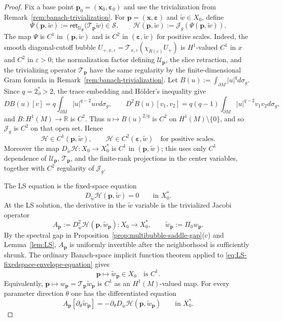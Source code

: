 \documentclass[11pt,reqno,a4paper]{amsart}
\numberwithin{equation}{section}
\theoremstyle{plain}
\theoremstyle{remark}
\theoremstyle{plain}
\begin{document}
\begin{proof}
Fix a base point $\mathbf p_0=(\mathbf x_0,\boldsymbol\varepsilon_0)$ and use the trivialization from
Remark~\ref{rem:banach-trivialization}.  For $\mathbf p=(\mathbf x,\boldsymbol\varepsilon)$ and
$\tilde w\in X_0$, define
\[
\Psi(\mathbf p,\tilde w)
:=
\mathsf{ret}_{\mathcal U_{\mathbf p}}
\bigl(\mathcal T_{\mathbf p}\tilde w\bigr)
\in\mathcal S,
\qquad
\mathscr H(\mathbf p,\tilde w)
:=\mathcal J_g(\Psi(\mathbf p,\tilde w)).
\]
The map $\Psi$ is $C^1$ in $(\mathbf p,\tilde w)$ and is $C^2$ in
$(\boldsymbol\varepsilon,\tilde w)$ for positive scales.  Indeed, the smooth diagonal-cutoff bubble
$U_{+,x,\varepsilon}=\mathcal T_{x,\varepsilon}(\chi_{R(\varepsilon)}U_+)$ is $H^1$-valued $C^1$ in
$x$ and $C^2$ in $\varepsilon>0$; the normalization factor defining
$\mathcal U_{\mathbf p}$, the slice retraction, and the trivializing operator
$\mathcal T_{\mathbf p}$ have the same regularity by the finite-dimensional Gram formula in
Remark~\ref{rem:banach-trivialization}.
Let $B(u):=\int_{\partial M}|u|^qd\sigma_g$.  Since $q=2^*_{\partial}>2$, the trace embedding and
H\"older's inequality give
\[
DB(u)[v]=q\int_{\partial M}|u|^{q-2}uvd\sigma_g,
\qquad
D^2B(u)[v_1,v_2]=q(q-1)\int_{\partial M}|u|^{q-2}v_1v_2d\sigma_g,
\]
and $B:H^1(M)\to\mathbb R$ is $C^2$.  Thus $u\mapsto B(u)^{2/q}$ is $C^2$ on
$H^1(M)\setminus\{0\}$, and so $\mathcal J_g$ is $C^2$ on that open set.  Hence
\[
\mathscr H\in C^1(\mathbf p,\tilde w),
\qquad
\mathscr H\in C^2(\boldsymbol\varepsilon,\tilde w)
\quad\text{for positive scales.}
\]
Moreover the map $D_{\tilde w}\mathscr H:X_0\to X_0^\ast$ is $C^1$ in
$(\mathbf p,\tilde w)$; this uses only $C^1$ dependence of $\mathcal U_{\mathbf p}$,
$\mathcal T_{\mathbf p}$, and the finite-rank projections in the center variables, together with
$C^2$ regularity of $\mathcal J_g$.

The LS equation is the fixed-space equation
\begin{equation}\label{eq:LS-fixedspace-envelope-equation}
D_{\tilde w}\mathscr H(\mathbf p,\tilde w)=0
\qquad\text{in }X_0^\ast .
\end{equation}
At the LS solution, the derivative in the $\tilde w$ variable is the trivialized Jacobi operator
\[
A_{\mathbf p}:=D_{\tilde w}^2\mathscr H(\mathbf p,\tilde w_{\mathbf p}):X_0\longrightarrow X_0^\ast,
\qquad
\tilde w_{\mathbf p}:=\Pi_0 w_{\mathbf p}.
\]
By the spectral gap in Proposition~\ref{prop:multibubble-saddle-gap}\textup{(c)} and Lemma~\ref{lem:LS},
$A_{\mathbf p}$ is uniformly invertible after the neighborhood is sufficiently shrunk.  The ordinary Banach-space
implicit function theorem applied to \eqref{eq:LS-fixedspace-envelope-equation} gives
\[
\mathbf p\longmapsto \tilde w_{\mathbf p}\in X_0
\quad\text{is }C^1.
\]
Equivalently, $\mathbf p\mapsto w_{\mathbf p}=\mathcal T_{\mathbf p}\tilde w_{\mathbf p}$ is $C^1$ as an
$H^1(M)$-valued map.  For every parameter direction $\theta$ one has the differentiated equation
\begin{equation}\label{eq:LS-first-derivative-formula}
A_{\mathbf p}[\partial_\theta\tilde w_{\mathbf p}]
=-\partial_\theta D_{\tilde w}\mathscr H(\mathbf p,\tilde w_{\mathbf p})
\qquad\text{in }X_0^\ast .
\end{equation}


\end{proof}
\end{document}
